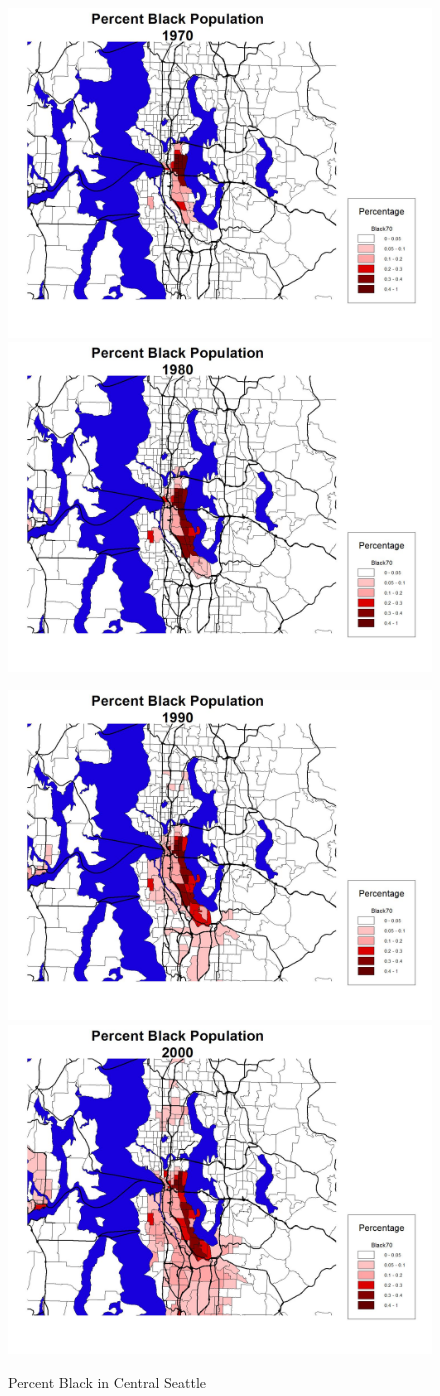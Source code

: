 \documentclass[12pt,a4paper]{article}
\begin{document}
\begin{figure}[h]
\centerline{
 \includegraphics[width=.45\textwidth,height=0.35\textwidth]
 {pctblack1970.jpg} \hspace{1cm}
 \includegraphics[width=.45\textwidth,height=0.35\textwidth]
 {pctblack1980.jpg}}
\end{figure}

\begin{figure}[h]
\centerline{
 \includegraphics[width=.45\textwidth,height=0.35\textwidth]
 {pctblack1990.jpg} \hspace{1cm}
 \includegraphics[width=.45\textwidth,height=0.35\textwidth]
 {pctblack2000.jpg}}
\caption{\label{fig:pctblack} Percent Black in Central Seattle}
\end{figure}
\end{document}
